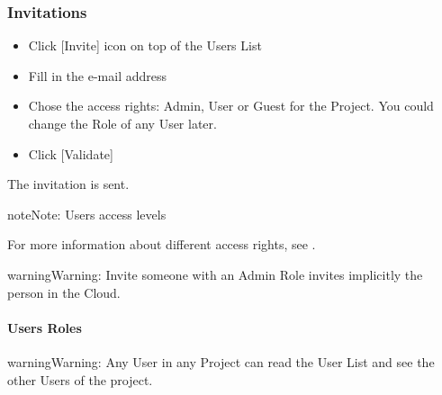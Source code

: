 \documentclass[a4paper,12pt,english]{sphinxmanual}
\begin{document}
\subsubsection{Invitations}
\label{\detokenize{platform/collaborate:invitations}}
\begin{figure}[htbp]
\centering

\noindent{}
\end{figure}
\begin{itemize}
\item {} 
Click {[}Invite{]} icon on top of the Users List

\item {} 
Fill in the e-mail address

\item {} 
Chose the access rights: Admin, User or Guest for the Project. You could change the Role of any User later.

\item {} 
Click {[}Validate{]}

\end{itemize}

The invitation is sent.

\begin{figure}[htbp]
\centering

\noindent{}
\end{figure}

\begin{sphinxadmonition}{note}{Note:}
Users access levels

For more information about different access rights, see .
\end{sphinxadmonition}

\begin{sphinxadmonition}{warning}{Warning:}
Invite someone with an Admin Role invites implicitly the person in the Cloud.
\end{sphinxadmonition}


\paragraph{Users Roles}
\label{\detokenize{platform/collaborate:users-roles}}
\begin{sphinxadmonition}{warning}{Warning:}
Any User in any Project can read the User List and see the other Users of the project.
\end{sphinxadmonition}
\end{document}
